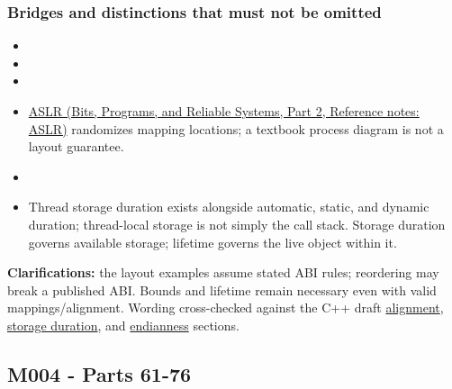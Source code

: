 {\begin{longtable}[]{@{}
  >{\raggedright\arraybackslash}p{}
  >{\raggedright\arraybackslash}p{}@{}}
\end{longtable}
}

\subsubsection{Bridges and distinctions that must not be omitted}\label{appendix-fd090d982a15-bridges-and-distinctions-that-must-not-be-omitted}

\hypertarget{appendix-fd090d982a15-bridges-and-distinctions-that-must-not-be-omitted}{}

\begin{itemize}
\tightlist
\item
\item
\item
\item
  \href{../01-Bits-Programs-and-Reliable-Systems-P02/main.pdf\#appendix-78cb248c8355}{ASLR (Bits, Programs, and Reliable Systems, Part 2, Reference notes: ASLR)} randomizes mapping locations; a textbook process diagram is not a layout guarantee.
\item
\item
  Thread storage duration exists alongside automatic, static, and dynamic duration; thread-local storage is not simply the call stack. Storage duration governs available storage; lifetime governs the live object within it.
\end{itemize}

\textbf{Clarifications:} the layout examples assume stated ABI rules; reordering may break a published ABI. Bounds and lifetime remain necessary even with valid mappings/alignment. Wording cross-checked against the C++ draft \href{https://eel.is/c++draft/basic.align}{alignment}, \href{https://eel.is/c++draft/basic.stc}{storage duration}, and \href{https://eel.is/c++draft/bit.endian}{endianness} sections.

\subsection{M004 - Parts 61-76}\label{appendix-fd090d982a15-m004---parts-61-76}

\hypertarget{appendix-fd090d982a15-m004---parts-61-76}{}

